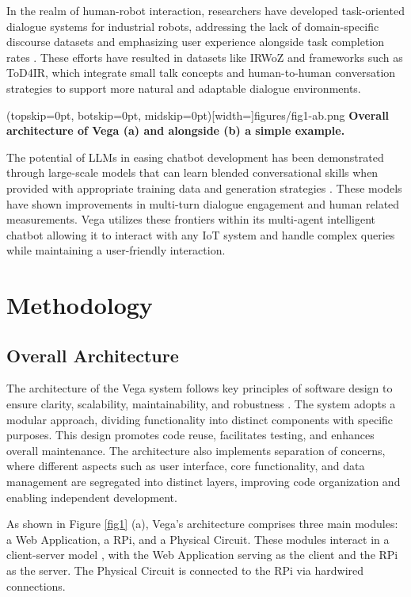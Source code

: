 \documentclass{ieeeaccess}
\begin{document}
In the realm of human-robot interaction, researchers have developed task-oriented dialogue systems for industrial robots, addressing the lack of domain-specific discourse datasets and emphasizing user experience alongside task completion rates \cite{9869659}. These efforts have resulted in datasets like IRWoZ and frameworks such as ToD4IR, which integrate small talk concepts and human-to-human conversation strategies to support more natural and adaptable dialogue environments.

\Figure[t!](topskip=0pt, botskip=0pt,
midskip=0pt)[width=\textwidth]{{figures/fig1-ab.png}}
{ \centering \textbf{Overall architecture of Vega (a) and alongside (b) a simple example.}\label{fig1}}

The potential of LLMs in easing chatbot development has been demonstrated through large-scale models that can learn blended conversational skills when provided with appropriate training data and generation strategies \cite{roller-etal-2021-recipes}. These models have shown improvements in multi-turn dialogue engagement and human related measurements. Vega utilizes these frontiers within its multi-agent intelligent chatbot allowing it to interact with any IoT system and handle complex queries while maintaining a user-friendly interaction.



\section{Methodology}\label{sec:methodology}
\subsection{Overall Architecture}

The architecture of the Vega system follows key principles of software design to ensure clarity, scalability, maintainability, and robustness \cite{taylor2010software}. The system adopts a modular approach, dividing functionality into distinct components with specific purposes. This design promotes code reuse, facilitates testing, and enhances overall maintenance. The architecture also implements separation of concerns, where different aspects such as user interface, core functionality, and data management are segregated into distinct layers, improving code organization and enabling independent development.

As shown in Figure \ref{fig1} (a), Vega's architecture comprises three main modules: a Web Application, a RPi, and a Physical Circuit. These modules interact in a client-server model \cite{tanenbaum2002distributed}, with the Web Application serving as the client and the RPi as the server. The Physical Circuit is connected to the RPi via hardwired connections.
\end{document}

